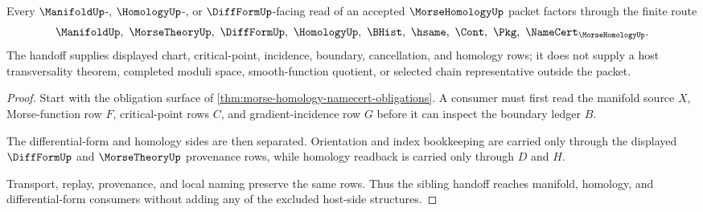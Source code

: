 \begin{theorem}
\label{thm:morse-homology-sibling-handoff}
Every $\ManifoldUp$-, $\HomologyUp$-, or $\DiffFormUp$-facing read of an accepted $\MorseHomologyUp$ packet factors through the finite route
$$
\ManifoldUp,\ \MorseTheoryUp,\ \DiffFormUp,\ \HomologyUp,\ \BHist,\ \hsame,\ \Cont,\ \Pkg,\ \NameCert_{\MorseHomologyUp}.
$$
The handoff supplies displayed chart, critical-point, incidence, boundary, cancellation, and homology rows; it does not supply a host transversality theorem, completed moduli space, smooth-function quotient, or selected chain representative outside the packet.
\end{theorem}
\begin{proof}
Start with the obligation surface of \autoref{thm:morse-homology-namecert-obligations}. A consumer must first read the manifold source $X$, Morse-function row $F$, critical-point rows $C$, and gradient-incidence row $G$ before it can inspect the boundary ledger $B$.

The differential-form and homology sides are then separated. Orientation and index bookkeeping are carried only through the displayed $\DiffFormUp$ and $\MorseTheoryUp$ provenance rows, while homology readback is carried only through $D$ and $H$.

Transport, replay, provenance, and local naming preserve the same rows. Thus the sibling handoff reaches manifold, homology, and differential-form consumers without adding any of the excluded host-side structures.
\end{proof}


\begin{closurestatus}{\MorseHomologyUp}
  \theoryclosure{\seedClosure}
  \formalstatus{\unformalizedV}
\end{closurestatus}
